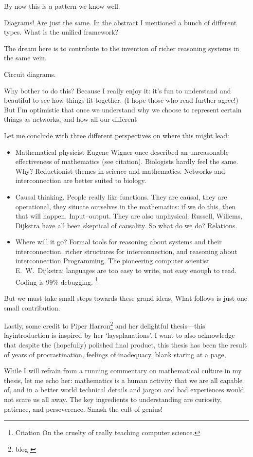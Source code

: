 By now this is a pattern we know well. 

Diagrams! Are just the same. In the abstract I mentioned a bunch of different
types. What is the unified framework? 

The dream here is to contribute to the invention of richer reasoning systems in
the same vein.

Circuit diagrams.

Why bother to do this? Because I really enjoy it: it's fun to understand and
beautiful to see how things fit together. (I hope those who read further agree!)
But I'm optimistic that once we understand why we choose to represent certain
things as networks, and how all our different 

Let me conclude with three different perspectives on where this might lead:

\begin{itemize}
  \item Mathematical physicist Eugene Wigner once described an unreasonable effectiveness of mathematics (see
citation). Biologists hardly feel the same.
Why? Reductionist themes in science and mathematics. Networks and interconnection are better suited to biology.

\item Causal thinking. 
People really like functions. They are causal, they are operational, they situate ourselves in the mathematics: if we do this, then that will happen. Input--output. They are also unphysical. Russell, Willems, Dijkstra have all been skeptical of causality. So what do we do? Relations.

\item Where will it go? Formal tools for reasoning about systems and their
  interconnection.  richer structures for interconnection, and reasoning about
  interconnection Programming. The pioneering computer scientist E.\ W.\
  Dijkstra: languages are too easy to write, not easy enough to read. Coding is
  99\% debugging. \footnote{Citation On the cruelty of really teaching computer
  science.}
\end{itemize}

But we must take small steps towards these grand ideas. What follows is just one
small contribution.

Lastly, some credit to Piper Harron\footnote{blog \cite{Har15}} and her delightful
thesis---this layintroduction is inspired by her `laysplanations'. I want to also acknowledge that
despite the (hopefully) polished final product, this thesis has been the result
of years of procrastination, feelings of inadequacy, blank staring at a page, 

While I will refrain from a running commentary on mathematical culture in my
thesis, let me echo her: mathematics is a human activity that we are all capable
of, and in a better world technical details and jargon and bad experiences would
not scare us all away. The key ingredients to understanding are curiosity,
patience, and perseverence. Smash the cult of genius! 

